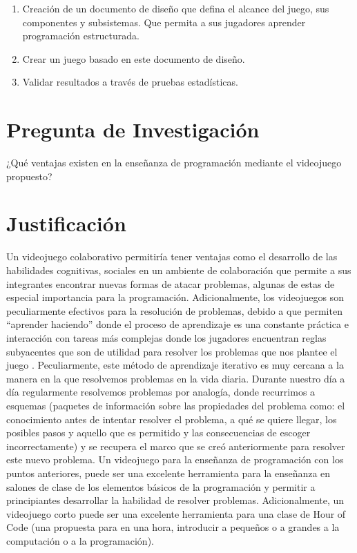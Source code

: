 \begin{enumerate}
    \item Creación de un documento de diseño que defina el alcance del juego, sus componentes y subsistemas. Que permita a sus jugadores aprender programación estructurada.
    \item Crear un juego basado en este documento de diseño.
    \item Validar resultados a través de pruebas estadísticas.
\end{enumerate}

\section{Pregunta de Investigación}
¿Qué ventajas existen en la enseñanza de programación mediante el videojuego propuesto?

\section{Justificación}
Un videojuego colaborativo permitiría tener ventajas como el desarrollo de las habilidades cognitivas, sociales en un ambiente de colaboración que permite a sus integrantes encontrar nuevas formas de atacar problemas, algunas de estas de especial importancia para la programación. 
Adicionalmente, los videojuegos son peculiarmente efectivos para la resolución de problemas, debido a que permiten “aprender haciendo” donde el proceso de aprendizaje es una constante práctica e interacción con tareas más complejas donde los jugadores encuentran reglas subyacentes que son de utilidad para resolver los problemas que nos plantee el juego \cite{monjelat-a}. Peculiarmente, este método de aprendizaje iterativo es muy cercana a la manera en la que resolvemos problemas en la vida diaria. Durante nuestro día a día regularmente resolvemos problemas por analogía, donde recurrimos a esquemas (paquetes de información sobre las propiedades del problema como: el conocimiento antes de intentar resolver el problema, a qué se quiere llegar, los posibles pasos y aquello que es permitido y las consecuencias de escoger incorrectamente) y se recupera el marco que se creó anteriormente para resolver este nuevo problema.
Un videojuego para la enseñanza de programación con los puntos anteriores, puede ser una excelente herramienta para la enseñanza en salones de clase de los elementos básicos de la programación y permitir a principiantes desarrollar la habilidad de resolver problemas. Adicionalmente, un videojuego corto puede ser una excelente herramienta para una clase de Hour of Code (una propuesta para en una hora, introducir a pequeños o a grandes a la computación o a la programación).


